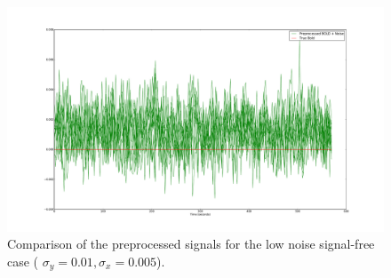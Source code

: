 
\begin{figure}[H]
\centering
\includegraphics[clip=true,trim=6cm 2cm 6cm 3.5cm,width=15cm]{images/preprocessed_noiseonly}
\caption{Comparison of the preprocessed signals for the low noise signal-free case (
$\sigma_y = 0.01, \sigma_x = 0.005$).}
\label{fig:PreprocessedNoiseOnly}
\end{figure}

